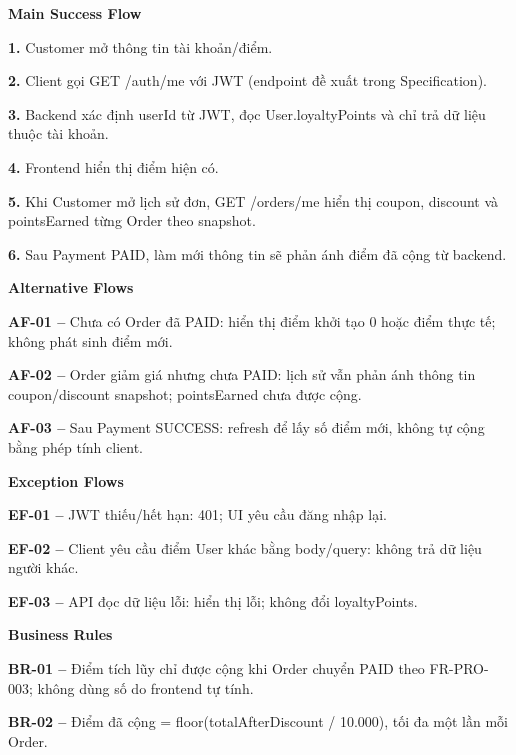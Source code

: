 \documentclass[11pt,a4paper,oneside]{report}
\begin{document}
\par\smallskip\noindent\textcolor{sgublue}{\textbf{Main Success Flow}}\par\nobreak
\textbf{1.} Customer mở thông tin tài khoản/điểm.

\textbf{2.} Client gọi GET /auth/me với JWT (endpoint đề xuất trong Specification).

\textbf{3.} Backend xác định userId từ JWT, đọc User.loyaltyPoints và chỉ trả dữ liệu thuộc tài khoản.

\textbf{4.} Frontend hiển thị điểm hiện có.

\textbf{5.} Khi Customer mở lịch sử đơn, GET /orders/me hiển thị coupon, discount và pointsEarned từng Order theo snapshot.

\textbf{6.} Sau Payment PAID, làm mới thông tin sẽ phản ánh điểm đã cộng từ backend.
\par

\par\smallskip\noindent\textcolor{sgublue}{\textbf{Alternative Flows}}\par\nobreak
\textbf{AF-01 --} Chưa có Order đã PAID: hiển thị điểm khởi tạo 0 hoặc điểm thực tế; không phát sinh điểm mới.

\textbf{AF-02 --} Order giảm giá nhưng chưa PAID: lịch sử vẫn phản ánh thông tin coupon/discount snapshot; pointsEarned chưa được cộng.

\textbf{AF-03 --} Sau Payment SUCCESS: refresh để lấy số điểm mới, không tự cộng bằng phép tính client.
\par

\par\smallskip\noindent\textcolor{sgublue}{\textbf{Exception Flows}}\par\nobreak
\textbf{EF-01 --} JWT thiếu/hết hạn: 401; UI yêu cầu đăng nhập lại.

\textbf{EF-02 --} Client yêu cầu điểm User khác bằng body/query: không trả dữ liệu người khác.

\textbf{EF-03 --} API đọc dữ liệu lỗi: hiển thị lỗi; không đổi loyaltyPoints.
\par

\par\smallskip\noindent\textcolor{sgublue}{\textbf{Business Rules}}\par\nobreak
\textbf{BR-01 --} Điểm tích lũy chỉ được cộng khi Order chuyển PAID theo FR-PRO-003; không dùng số do frontend tự tính.

\textbf{BR-02 --} Điểm đã cộng = floor(totalAfterDiscount / 10.000), tối đa một lần mỗi Order.
\end{document}
